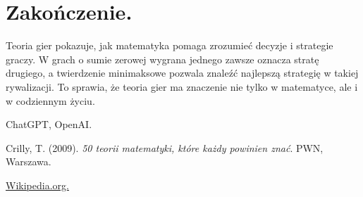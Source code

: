 \documentclass[12pt]{article}
\begin{document}
\section{Zakończenie.}
Teoria gier pokazuje, jak matematyka pomaga zrozumieć decyzje i strategie graczy. 
W grach o sumie zerowej wygrana jednego zawsze oznacza stratę drugiego, a twierdzenie minimaksowe pozwala znaleźć najlepszą strategię w takiej rywalizacji. 
To sprawia, że teoria gier ma znaczenie nie tylko w matematyce, ale i w codziennym życiu.



\begin{thebibliography}{9}

ChatGPT, OpenAI.

Crilly, T. (2009). \textit{50 teorii matematyki, które każdy powinien znać}. PWN, Warszawa.

\href{https://pl.wikipedia.org/wiki/Teoria\_gier}{Wikipedia.org.}

\end{thebibliography}
\end{document}
